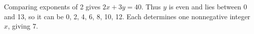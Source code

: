 Comparing exponents of 2 gives $2x+3y=40$. Thus $y$ is even and lies between 0 and 13, so it can be 0, 2, 4, 6, 8, 10, 12. Each determines one nonnegative integer $x$, giving $\boxed7$.
